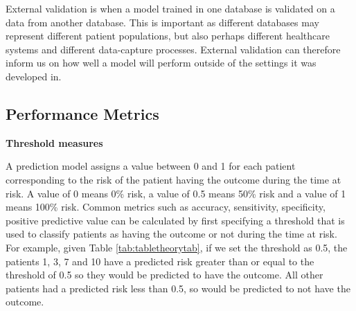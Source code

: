 \documentclass[11pt]{book}
\theoremstyle{definition}
\theoremstyle{definition}
\theoremstyle{definition}
\theoremstyle{remark}
\begin{document}
External validation is when a model trained in one database is validated on a data from another database. This is important as different databases may represent different patient populations, but also perhaps different healthcare systems and different data-capture processes. External validation can therefore inform us on how well a model will perform outside of the settings it was developed in.

\hypertarget{performance}{%
\subsection{Performance Metrics}\label{performance}}

\textbf{Threshold measures}

A prediction model assigns a value between 0 and 1 for each patient corresponding to the risk of the patient having the outcome during the time at risk. A value of 0 means 0\% risk, a value of 0.5 means 50\% risk and a value of 1 means 100\% risk. Common metrics such as accuracy, sensitivity, specificity, positive predictive value can be calculated by first specifying a threshold that is used to classify patients as having the outcome or not during the time at risk. For example, given Table \ref{tab:tabletheorytab}, if we set the threshold as 0.5, the patients 1, 3, 7 and 10 have a predicted risk greater than or equal to the threshold of 0.5 so they would be predicted to have the outcome. All other patients had a predicted risk less than 0.5, so would be predicted to not have the outcome.     
\end{document}
